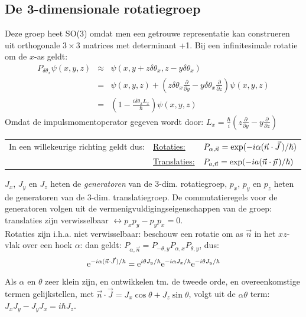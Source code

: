 \documentclass[twoside]{report}
\begin{document}
\subsection{De 3-dimensionale rotatiegroep}
Deze groep heet SO(3) omdat men een getrouwe representatie kan construeren
uit orthogonale $3\times3$ matrices met determinant +1.
\npar
Bij een infinitesimale rotatie om de $x$-as geldt:
\begin{eqnarray*}
P_{\delta\theta_x}\psi(x,y,z)&\approx&\psi(x,y+z\delta\theta_x,z-y\delta\theta_x)\\
&=&\psi(x,y,z)+\left(z\delta\theta_x\frac{\partial}{\partial y}-y\delta\theta_x\frac{\partial}{\partial z}\right)\psi(x,y,z)\\
&=&\left(1-\frac{i\delta\theta_xL_x}{\hbar}\right)\psi(x,y,z)
\end{eqnarray*}
Omdat de impulsmomentoperator gegeven wordt door:
$\displaystyle L_x=\frac{\hbar}{i}
\left(z\frac{\partial}{\partial y}-y\frac{\partial}{\partial z}\right)$
\npar
\begin{tabular}[t]{lll}
In een willekeurige richting geldt dus:
&\underline{Rotaties:}&$P_{\alpha,\vec{n}}=\exp(-i\alpha(\vec{n}\cdot\vec{J}\hspace{0.5mm})/\hbar)$\\
&\underline{Translaties:}&$P_{a,\vec{n}}=\exp(-ia(\vec{n}\cdot\vec{p}\hspace{0.5mm})/\hbar)$\\
\end{tabular}
\npar
$J_x$, $J_y$ en $J_z$ heten de {\it generatoren} van de 3-dim. rotatiegroep,
$p_x$, $p_y$ en $p_z$ heten de generatoren van de 3-dim. translatiegroep.
\npar
De commutatieregels voor de generatoren volgen uit de vermenigvuldigingseigenschappen
van de groep: translaties zijn verwisselbaar $\leftrightarrow p_xp_y-p_yp_x=0$.\\
Rotaties zijn i.h.a. niet verwisselbaar: beschouw een rotatie om as $\vec{n}$
in het $xz$-vlak over een hoek $\alpha$: dan geldt:
$P_{\alpha,\vec{n}}=P_{-\theta,y}P_{\alpha,x}P_{\theta,y}$, dus:
\[
{\rm e}^{-i\alpha(\vec{n}\cdot\vec{J}\,)/\hbar}=
{\rm e}^{i\theta J_y/\hbar}{\rm e}^{-i\alpha J_x/\hbar}{\rm e}^{-i\theta J_y/\hbar}
\]
Als $\alpha$ en $\theta$ zeer klein zijn, en ontwikkelen tm. de tweede orde,
en overeenkomstige termen gelijkstellen, met $\vec{n}\cdot\vec{J}=J_x\cos\theta+J_z\sin\theta$,
volgt uit de $\alpha\theta$ term: $J_xJ_y-J_yJ_x=i\hbar J_z$.
\end{document}
